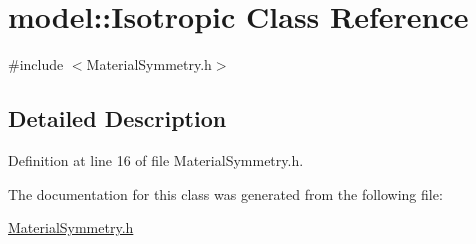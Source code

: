 \hypertarget{classmodel_1_1_isotropic}{}\section{model\+:\+:Isotropic Class Reference}
\label{classmodel_1_1_isotropic}


{\ttfamily \#include $<$Material\+Symmetry.\+h$>$}



\subsection{Detailed Description}


Definition at line 16 of file Material\+Symmetry.\+h.



The documentation for this class was generated from the following file\+:\begin{DoxyCompactItemize}
\item 
\hyperlink{_material_symmetry_8h}{Material\+Symmetry.\+h}\end{DoxyCompactItemize}
